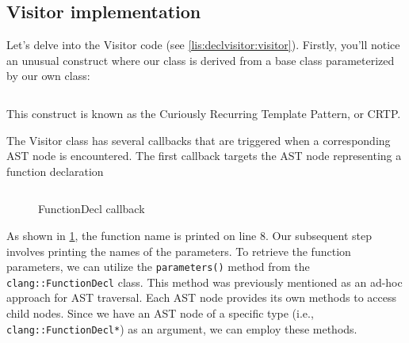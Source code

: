 \subsection{Visitor implementation}
\label{sec:part1:ch3:visitor_implementation}
Let's delve into the Visitor code (see \cref{lis:declvisitor:visitor}).
Firstly, you'll notice an unusual construct where our class is derived from a
base class parameterized by our own class: 
\inputminted[firstline=5,lastline=5]{c++}{src/part1/ch3_ast/declvisitor/Visitor.hpp}
This construct is known as the Curiously Recurring Template Pattern, or CRTP.

The Visitor class has several callbacks that are triggered when a corresponding
AST node is encountered. The first callback targets the AST node representing a
function declaration
\begin{figure}[H]
  \inputminted[firstline=7,lastline=12]{c++}{src/part1/ch3_ast/declvisitor/Visitor.hpp}
  \caption{FunctionDecl callback}
  \label{lis:declvisitor:visitor:visitfunctiondecl}
\end{figure}
As shown in \cref{lis:declvisitor:visitor:visitfunctiondecl}, the function name
is printed on line 8. Our subsequent step involves printing the names of the
parameters. To retrieve the function parameters, we can utilize the
\texttt{parameters()} method from the
\texttt{clang::FunctionDecl} class. This method was previously
mentioned as an ad-hoc approach for AST traversal. Each AST node provides its
own methods to access child nodes. Since we have an AST node of a specific type
(i.e., \texttt{clang::FunctionDecl*}) as an argument, we can employ
these methods. 

